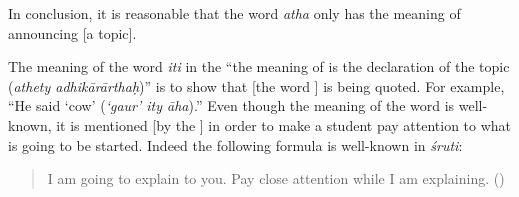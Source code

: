 In%
 conclusion, it is reasonable that
the word \emph{atha\/} only has the meaning of announcing [a topic].

The%
 meaning of the word \emph{iti} in
the ``the meaning of \atha{} is the declaration of the topic (\emph{athety
  adhikārārthaḥ})'' is to show that [the word \atha{}] is being quoted.  For
example, ``He said `cow' (\emph{`gaur' ity āha}).''  Even though the meaning of the word \atha{} is well-known, it is mentioned [by the \Bhasyakara] in order to make a student pay attention to what is going to be started.  Indeed the following formula
is well-known in \emph{śruti}:
\begin{quote}
        I am going to explain to you.  Pay close attention while I am 
        explaining.  ()
\end{quote}

